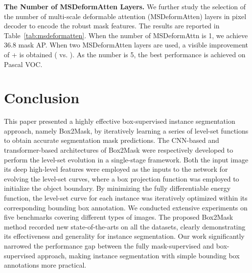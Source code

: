 \documentclass[12pt,onecolumn,letterpaper]{article}
\begin{document}
\textbf{The Number of MSDeformAtten Layers.}  We further study the selection of the number of multi-scale deformable
attention (MSDeformAtten) layers in pixel decoder to encode the robust mask features.
The results are reported in Table~\ref{tab:msdeformatten}.
When the number of MSDeformAttn is 1, we achieve 36.8 mask AP. When two MSDeformAtten layers are used, a visible improvement of + is obtained ( vs. ). As the number is 5, the best performance  is achieved on Pascal VOC.



\section{Conclusion}
This paper presented a highly effective box-supervised instance segmentation approach, namely Box2Mask, by iteratively learning a series of level-set functions to obtain accurate segmentation mask predictions. 
The CNN-based and transformer-based architectures of Box2Mask were respectively developed to perform the level-set evolution in a single-stage framework.
Both the input image its deep high-level features were employed as the inputs to the network for evolving the level-set curves, where a box projection function was employed to initialize the object boundary. By minimizing the fully differentiable energy function, the level-set curve for each instance was iteratively optimized within its corresponding bounding box annotation. We conducted extensive experiments on five benchmarks covering different types of images. The proposed Box2Mask method recorded new state-of-the-arts on all the datasets, clearly demonstrating its effectiveness and generality for instance segmentation. Our work significantly narrowed the performance gap between the fully mask-supervised and box-supervised approach, making instance segmentation with simple bounding box annotations more practical.


{\small
	
	
}
\end{document}

